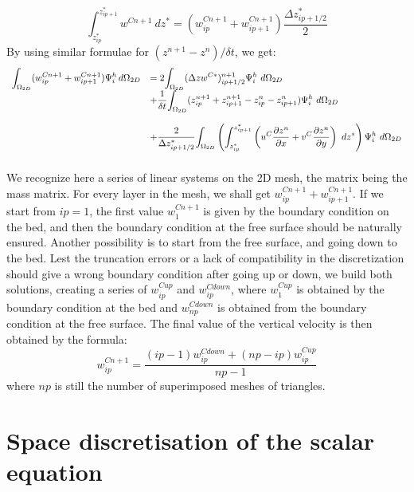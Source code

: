 \begin{equation}
\int_{z_{ip}^{\ast}}^{z_{ip+1}^{\ast}}w^{Cn+1}~dz^{\ast}=(w_{ip}^{Cn+1}%
+w_{ip+1}^{Cn+1})\dfrac{\Delta z_{ip+1/2}^{\ast}}{2}%
\end{equation}
By using similar formulae for $(z^{n+1}-z^{n})/\delta t$, we get:%
\begin{equation}
\begin{array}{ll}
\displaystyle{\int_{\Omega_{2D}}}(w_{ip}^{Cn+1}+w_{ip+1}^{Cn+1})\Psi_{i}^{h}\,d\Omega
_{2D}& =2\displaystyle{\int_{\Omega_{2D}}}(\Delta zw^{C\ast})_{ip+1/2}^{n+1}\Psi_{i}^{h}
~d\Omega_{2D}\\\bigskip
& +\dfrac{1}{\delta t}\displaystyle{\int_{\Omega_{2D}}}(z_{ip}^{n+1}+z_{ip+1}^{n+1}-z_{ip}%
^{n}-z_{ip+1}^{n})\Psi_{i}^{h}~d\Omega_{2D} \\\bigskip
& +\dfrac{2}{\Delta z_{ip+1/2}^{\ast}}\displaystyle{\int_{\Omega_{2D}}}\left(  \int%
_{z_{ip}^{\ast}}^{z_{ip+1}^{\ast}}\left(  u^C\dfrac{\partial z^{n}}{\partial
x}+v^C\dfrac{\partial z^{n}}{\partial y}\right)  ~dz^{\ast}\right)  \Psi_{i}^{h}
~d\Omega_{2D}
\end{array}
\end{equation}
We recognize here a series of linear systems on the 2D mesh, the matrix being
the mass matrix. For every layer in the mesh, we shall get $w_{ip}%
^{Cn+1}+w_{ip+1}^{Cn+1}$. If we start from $ip=1$, the first value $w_{1}^{Cn+1}$
is given by the boundary condition on the bed,
and then the boundary condition at the free surface
should be naturally ensured. Another possibility is to start from the free
surface, and going down to the bed.
Lest the truncation errors or a lack of compatibility in the discretization
should give a wrong boundary condition after going up or down, we build both
solutions, creating a series of $w_{ip}^{Cup}$ and $w_{ip}^{Cdown}$, where
$w_{1}^{Cup}$ is obtained by the boundary condition at the bed and
$w_{np}^{Cdown}$ is obtained from the boundary condition at the free surface.
The final value of the vertical velocity is then obtained by the formula:%
\begin{equation}
w_{ip}^{Cn+1}=\dfrac{(ip-1)w_{ip}^{Cdown}+(np-ip)w_{ip}^{Cup}}{np-1}%
\end{equation}
where $np$ is still the number of superimposed meshes of triangles.

\section{\label{scalar in dimension 3}Space discretisation of the scalar equation}

